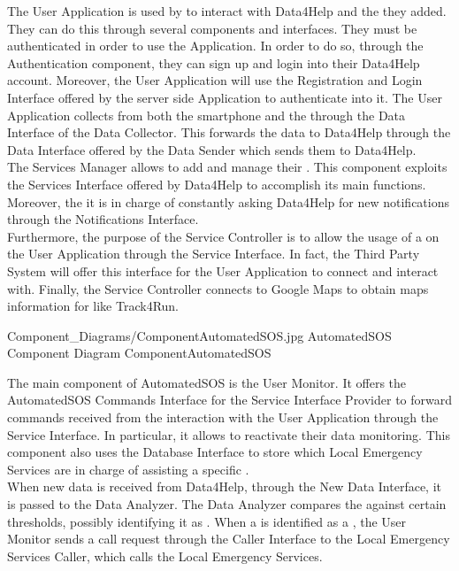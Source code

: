 \documentclass[../../DD.tex]{subfiles}
\begin{document}
	The User Application is used by  to interact with Data4Help and the  they added. They can do this through several components and interfaces. They must be authenticated in order to use the Application. In order to do so, through the Authentication component, they can sign up and login into their Data4Help account. Moreover, the User Application will use the Registration and Login Interface offered by the server side Application to authenticate into it.
	The User Application collects  from both the smartphone and the  through the Data Interface of the Data Collector. This forwards the data to Data4Help through the Data Interface offered by the Data Sender which sends them to Data4Help.\\
	The Services Manager allows  to add and manage their . This component exploits the Services Interface offered by Data4Help to accomplish its main functions. Moreover, the it is in charge of constantly asking Data4Help for new notifications through the Notifications Interface.\\
	Furthermore, the purpose of the Service Controller is to allow the usage of a  on the User Application through the Service Interface. In fact, the Third Party System will offer this interface for the User Application to connect and interact with. Finally, the Service Controller connects to Google Maps to obtain maps information for  like Track4Run.

	\image {13cm} {Component_Diagrams/ComponentAutomatedSOS.jpg} {AutomatedSOS Component Diagram} {ComponentAutomatedSOS}

	The main component of AutomatedSOS is the User Monitor. It offers the AutomatedSOS Commands Interface for the Service Interface Provider to forward commands received from the interaction with the User Application through the Service Interface. In particular, it allows  to reactivate their data monitoring. This component also uses the Database Interface to store which Local Emergency Services are in charge of assisting a specific .\\
	When new data is received from Data4Help, through the New Data Interface, it is passed to the Data Analyzer. The Data Analyzer compares the  against certain thresholds, possibly identifying it as . When a  is identified as a , the User Monitor sends a call request through the Caller Interface to the Local Emergency Services Caller, which calls the Local Emergency Services.
\end{document}
